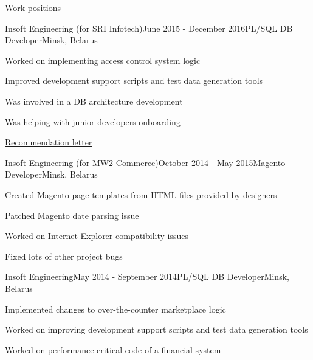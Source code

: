 \documentclass{resume} %
\begin{document}
\begin{rSection}{Work positions}
\begin{rSubsection}{Insoft Engineering (for SRI Infotech)}{June 2015 - December 2016}{PL/SQL DB Developer}{Minsk, Belarus}
\item Worked on implementing access control system logic
\item Improved development support scripts and test data generation tools
\item Was involved in a DB architecture development
\item Was helping with junior developers onboarding
\item \href{https://drive.google.com/file/d/0B256DYrZGsaVZHZJb3FMQ01hVHM/view}{Recommendation letter}
\end{rSubsection}

\begin{rSubsection}{Insoft Engineering (for MW2 Commerce)}{October 2014 - May 2015}{Magento Developer}{Minsk, Belarus}
\item Created Magento page templates from HTML files provided by designers
\item Patched Magento date parsing issue
\item Worked on Internet Explorer compatibility issues
\item Fixed lots of other project bugs
\end{rSubsection}

\begin{rSubsection}{Insoft Engineering}{May 2014 - September 2014}{PL/SQL DB Developer}{Minsk, Belarus}
\item Implemented changes to over-the-counter marketplace logic
\item Worked on improving development support scripts and test data generation tools
\item Worked on performance critical code of a financial system
\end{rSubsection}

\end{rSection}

\end{document}
